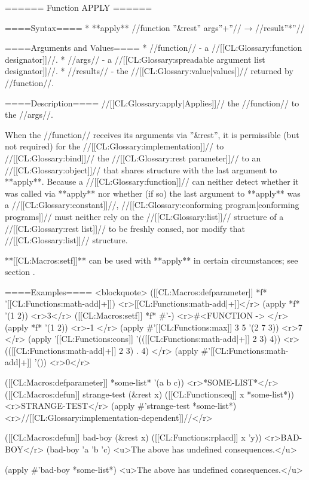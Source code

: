 ====== Function APPLY ======

====Syntax====
  * **apply** //function ''&rest'' args''+''// → //result''*''//

====Arguments and Values====
  * //function// - a //[[CL:Glossary:function designator]]//.
  * //args// - a //[[CL:Glossary:spreadable argument list designator]]//.
  * //results// - the //[[CL:Glossary:value|values]]// returned by //function//.

====Description====
//[[CL:Glossary:apply|Applies]]// the //function// to the //args//.

When the //function// receives its arguments via ''&rest'', it is permissible (but not required) for the //[[CL:Glossary:implementation]]// to //[[CL:Glossary:bind]]// the //[[CL:Glossary:rest parameter]]// to an //[[CL:Glossary:object]]// that shares structure with the last argument to **apply**. Because a //[[CL:Glossary:function]]// can neither detect whether it was called via **apply** nor whether (if so) the last argument to **apply** was a //[[CL:Glossary:constant]]//, //[[CL:Glossary:conforming program|conforming programs]]// must neither rely on the //[[CL:Glossary:list]]// structure of a //[[CL:Glossary:rest list]]// to be freshly consed, nor modify that //[[CL:Glossary:list]]// structure.

**[[CL:Macros:setf]]** can be used with **apply** in certain circumstances; see section {\secref\SETFofAPPLY}.

====Examples====
<blockquote>
([[CL:Macros:defparameter]] *f* '[[CL:Functions:math-add|+]]) 
<r>[[CL:Functions:math-add|+]]</r>
(apply *f* '(1 2)) <r>3</r>
([[CL:Macros:setf]] *f* #'-) <r>#<FUNCTION -> </r>
(apply *f* '(1 2)) <r>-1 </r>
(apply #'[[CL:Functions:max]] 3 5 '(2 7 3)) <r>7 </r>
(apply '[[CL:Functions:cons]] '(([[CL:Functions:math-add|+]] 2 3) 4)) <r>(([[CL:Functions:math-add|+]] 2 3) . 4) </r>
(apply #'[[CL:Functions:math-add|+]] '()) <r>0</r>

([[CL:Macros:defparameter]] *some-list* '(a b c)) <r>*SOME-LIST*</r>
([[CL:Macros:defun]] strange-test (&rest x)
  ([[CL:Functions:eq]] x *some-list*)) <r>STRANGE-TEST</r>
(apply #'strange-test *some-list*) <r>//[[CL:Glossary:implementation-dependent]]//</r>

([[CL:Macros:defun]] bad-boy (&rest x) 
  ([[CL:Functions:rplacd]] x 'y)) <r>BAD-BOY</r>
(bad-boy 'a 'b 'c)
<u>The above has undefined consequences.</u>

(apply #'bad-boy *some-list*)
<u>The above has undefined consequences.</u>

